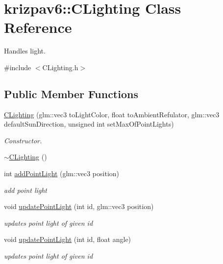 \hypertarget{classkrizpav6_1_1_c_lighting}{}\section{krizpav6\+::C\+Lighting Class Reference}
\label{classkrizpav6_1_1_c_lighting}


Handles light.  




{\ttfamily \#include $<$C\+Lighting.\+h$>$}

\subsection*{Public Member Functions}
\begin{DoxyCompactItemize}
\item 
\mbox{\hyperlink{classkrizpav6_1_1_c_lighting_a662c0e5621bed293f611157a1c95a5aa}{C\+Lighting}} (glm\+::vec3 to\+Light\+Color, float to\+Ambient\+Refulator, glm\+::vec3 default\+Sun\+Direction, unsigned int set\+Max\+Of\+Point\+Lights)
\begin{DoxyCompactList}\small\item\em Constructor. \end{DoxyCompactList}\item 
\mbox{\hyperlink{classkrizpav6_1_1_c_lighting_abf7694377690cd52bd174cdcf6e616c8}{$\sim$\+C\+Lighting}} ()
\item 
int \mbox{\hyperlink{classkrizpav6_1_1_c_lighting_aa798ddfe29e22d7b02bdfe204857cdf2}{add\+Point\+Light}} (glm\+::vec3 position)
\begin{DoxyCompactList}\small\item\em add point light \end{DoxyCompactList}\item 
void \mbox{\hyperlink{classkrizpav6_1_1_c_lighting_a933ede72c1f0a6bd7ca8667100678dd2}{update\+Point\+Light}} (int id, glm\+::vec3 position)
\begin{DoxyCompactList}\small\item\em updates point light of given id \end{DoxyCompactList}\item 
void \mbox{\hyperlink{classkrizpav6_1_1_c_lighting_ae39cafa0adc788b27d5f675b2af1f7b1}{update\+Point\+Light}} (int id, float angle)
\begin{DoxyCompactList}\small\item\em updates point light of given id \end{DoxyCompactList}\item 

\end{DoxyCompactItemize}
